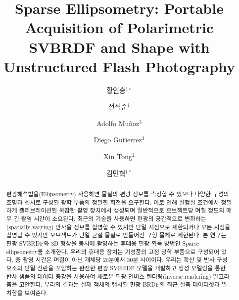 \documentclass[a4paper,twocolumn]{article}
\begin{document}
\title{Sparse Ellipsometry: Portable Acquisition of Polarimetric SVBRDF	and Shape with Unstructured Flash Photography}

\author{황인승$^{1\circ}$
\and 전석준$^{1}$
\and Adolfo Muñoz$^{3}$
\and Diego Gutierrez$^{3}$
\and Xin Tong$^{2}$
\and 김민혁$^{1*}$}







\begin{abstract}
편광해석법을(Ellipsometry) 사용하면 물질의 편광 정보를 측정할 수 있으나 다양한 구성의 조명과 센서로 구성된 광학 부품의 정밀한 회전을 요구한다. 이로 인해 실험실 조건에서 정밀하게 캘리브레이션된 복잡한 촬영 장치에서 생성되며 일반적으로 오브젝트당 며칠 정도의 매우 긴 촬영 시간이 소요된다. 최근의 기술을 사용하면 편광의 공간적으로 변화하는(spatially-varying) 반사율 정보를 촬영할 수 있지만 단일 시점으로 제한되거나 모든 시점을 촬영할 수 있지만 오브젝트가 단일 균질 물질로 만들어진 구형 물체로 제한된다. 본 연구는 편광 SVBRDF와 3D 형상을 동시에 촬영하는 휴대용 편광 획득 방법인 Sparse ellipsometry를 소개한다. 우리의 휴대용 장치는 기성품의 고정 광학 부품으로 구성되어 있다. 총 촬영 시간은 며칠이 아닌 개체당 20분에서 30분 사이이다. 우리는 확산 및 반사 구성 요소와 단일 산란을 포함하는 완전한 편광 SVBRDF 모델을 개발하고 생성 모델링을 통한 반사 샘플의 데이터 증강을 사용하여 새로운 편광 인버스 렌더링(inverse rendering) 알고리즘을 고안한다. 우리의 결과는 실제 객체의 캡처된 편광 BRDF의 최근 실측 데이터셋과 일치함을 보여준다.

\end{abstract}
\end{document}
